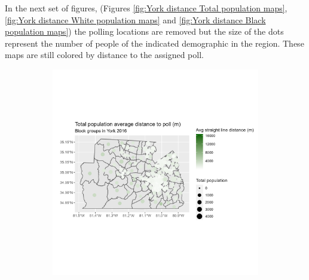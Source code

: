 \documentclass[11pt]{article}
\theoremstyle{remark}
\theoremstyle{definition}
\begin{document}
In the next set of figures, (Figures \ref{fig:York distance Total population maps}, \ref{fig:York distance White population maps} and \ref{fig:York distance Black population maps})  the polling locations are removed but the size of the dots represent the number of people of the indicated demographic in the region. These maps are still colored by distance to the assigned poll.

\begin{figure}
	\begin{subfigure}{.5\textwidth}
		\centering
		\includegraphics[width=\linewidth]{result_analysis/York_SC_original_configs/population_pop_and_dist_York_config_original_2016_polls.png}
		\label{sfig:York_2016_bg_dist_pop}
	\end{subfigure} 
	\begin{subfigure}{.5\textwidth}
		\centering

\end{subfigure}
\end{figure}
\end{document}
